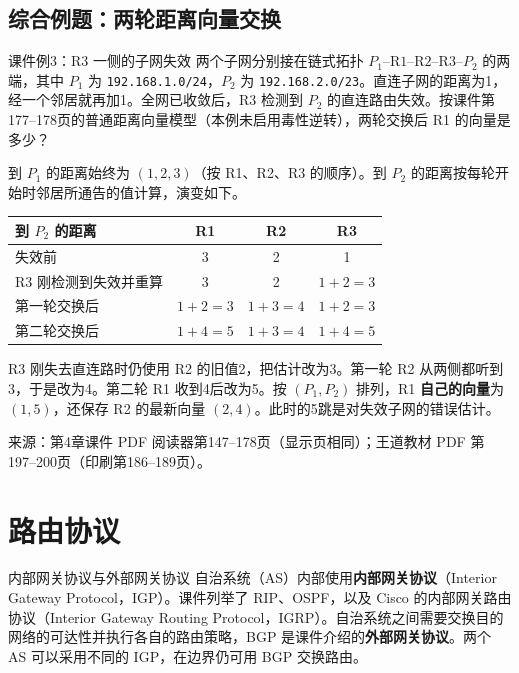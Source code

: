 \newpage
\subsection{综合例题：两轮距离向量交换}
\begin{example}{课件例3：R3 一侧的子网失效}
两个子网分别接在链式拓扑 $P_1\text{--}\mathrm{R1}\text{--}\mathrm{R2}\text{--}\mathrm{R3}\text{--}P_2$ 的两端，其中 $P_1$ 为 \texttt{192.168.1.0/24}，$P_2$ 为 \texttt{192.168.2.0/23}。直连子网的距离为1，经一个邻居就再加1。全网已收敛后，R3 检测到 $P_2$ 的直连路由失效。按课件第177--178页的普通距离向量模型（本例未启用毒性逆转），两轮交换后 R1 的向量是多少？
\end{example}
\begin{solution}
到 $P_1$ 的距离始终为 $(1,2,3)$（按 R1、R2、R3 的顺序）。到 $P_2$ 的距离按每轮开始时邻居所通告的值计算，演变如下。
\begin{center}\small
\begin{tabular}{lccc}
  \toprule
  到 $P_2$ 的距离 & R1 & R2 & R3\\\midrule
  失效前 & 3 & 2 & 1\\
  R3 刚检测到失效并重算 & 3 & 2 & $1+2=3$\\
  第一轮交换后 & $1+2=3$ & $1+3=4$ & $1+2=3$\\
  第二轮交换后 & $1+4=5$ & $1+3=4$ & $1+4=5$\\\bottomrule
\end{tabular}
\end{center}
R3 刚失去直连路时仍使用 R2 的旧值2，把估计改为3。第一轮 R2 从两侧都听到3，于是改为4。第二轮 R1 收到4后改为5。按 $(P_1,P_2)$ 排列，R1 \textbf{自己的向量}为 $\boxed{(1,5)}$，还保存 R2 的最新向量 $(2,4)$。此时的5跳是对失效子网的错误估计。
\end{solution}

\par\small\noindent 来源：第4章课件 PDF 阅读器第147--178页（显示页相同）；王道教材 PDF 第197--200页（印刷第186--189页）。\normalsize

\section{路由协议}
\begin{definition}{内部网关协议与外部网关协议}
自治系统（AS）内部使用\textbf{内部网关协议}（Interior Gateway Protocol，IGP）。课件列举了 RIP、OSPF，以及 Cisco 的内部网关路由协议（Interior Gateway Routing Protocol，IGRP）。自治系统之间需要交换目的网络的可达性并执行各自的路由策略，BGP 是课件介绍的\textbf{外部网关协议}。两个 AS 可以采用不同的 IGP，在边界仍可用 BGP 交换路由。
\end{definition}

